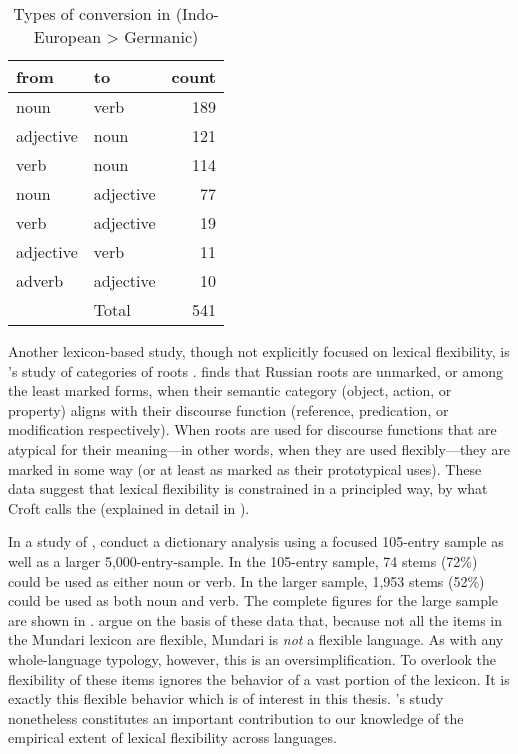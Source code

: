 \begin{table}[h]
  \centering
  \caption[Types of conversion in English (Indo-European > Germanic)]{Types of conversion in  (Indo-European > Germanic) \parencite[416]{Cannon1985}}
  \label{tab:Cannon-1985}
  \begin{tabular}{ l l r }
    \toprule
    from      & to        & count\\
    \midrule
    noun      & verb      & 189\\
    adjective & noun      & 121\\
    verb      & noun      & 114\\
    noun      & adjective & 77\\
    verb      & adjective & 19\\
    adjective & verb      & 11\\
    adverb    & adjective & 10\\
    \midrule
    { }       & Total     & 541\\
    \bottomrule
  \end{tabular}
\end{table}

Another lexicon-based study, though not explicitly focused on lexical flexibility, is \citeauthor{Croft1984}'s \parencite*{Croft1984} study of categories of  roots . \citeauthor{Croft1991} finds that Russian roots are unmarked, or among the least marked forms, when their semantic category (object, action, or property) aligns with their discourse function (reference, predication, or modification respectively). When roots are used for discourse functions that are atypical for their meaning—in other words, when they are used flexibly—they are marked in some way (or at least as marked as their prototypical uses). These data suggest that lexical flexibility is constrained in a principled way, by what Croft calls the  (explained in detail in ).

In a study of , \textcite{EvansOsada2005} conduct a dictionary analysis using a focused 105-entry sample as well as a larger 5,000-entry-sample. In the 105-entry sample, 74 stems (72\%) could be used as either noun or verb. In the larger sample, 1,953 stems (52\%) could be used as both noun and verb. The complete figures for the large sample are shown in . \citeauthor{EvansOsada2005} argue on the basis of these data that, because not all the items in the Mundari lexicon are flexible, Mundari is \emph{not} a flexible language. As with any whole-language typology, however, this is an oversimplification. To overlook the flexibility of these items ignores the behavior of a vast portion of the lexicon. It is exactly this flexible behavior which is of interest in this thesis. \citeauthor{EvansOsada2005}'s study nonetheless constitutes an important contribution to our knowledge of the empirical extent of lexical flexibility across languages.

